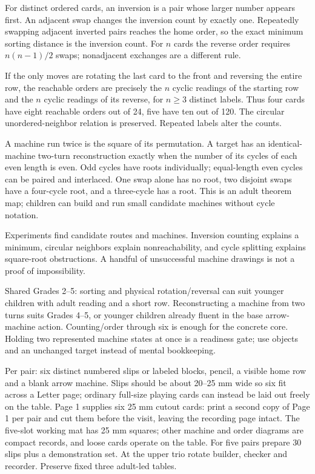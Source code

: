 For distinct ordered cards, an inversion is a pair whose larger number appears first. An adjacent swap changes the inversion count by exactly one. Repeatedly swapping adjacent inverted pairs reaches the home order, so the exact minimum sorting distance is the inversion count. For $n$ cards the reverse order requires $n(n-1)/2$ swaps; nonadjacent exchanges are a different rule.

If the only moves are rotating the last card to the front and reversing the entire row, the reachable orders are precisely the $n$ cyclic readings of the starting row and the $n$ cyclic readings of its reverse, for $n\ge 3$ distinct labels. Thus four cards have eight reachable orders out of 24, five have ten out of 120. The circular unordered-neighbor relation is preserved. Repeated labels alter the counts.

A machine run twice is the square of its permutation. A target has an identical-machine two-turn reconstruction exactly when the number of its cycles of each even length is even. Odd cycles have roots individually; equal-length even cycles can be paired and interlaced. One swap alone has no root, two disjoint swaps have a four-cycle root, and a three-cycle has a root. This is an adult theorem map; children can build and run small candidate machines without cycle notation.

Experiments find candidate routes and machines. Inversion counting explains a minimum, circular neighbors explain nonreachability, and cycle splitting explains square-root obstructions. A handful of unsuccessful machine drawings is not a proof of impossibility.

Shared Grades 2--5: sorting and physical rotation/reversal can suit younger children with adult reading and a short row. Reconstructing a machine from two turns suits Grades 4--5, or younger children already fluent in the base arrow-machine action. Counting/order through six is enough for the concrete core. Holding two represented machine states at once is a readiness gate; use objects and an unchanged target instead of mental bookkeeping.

Per pair: six distinct numbered slips or labeled blocks, pencil, a visible home row and a blank arrow machine. Slips should be about 20--25 mm wide so six fit across a Letter page; ordinary full-size playing cards can instead be laid out freely on the table. Page 1 supplies six 25 mm cutout cards: print a second copy of Page 1 per pair and cut them before the visit, leaving the recording page intact. The five-slot working mat has 25 mm squares; other machine and order diagrams are compact records, and loose cards operate on the table. For five pairs prepare 30 slips plus a demonstration set. At the upper trio rotate builder, checker and recorder. Preserve fixed three adult-led tables.

